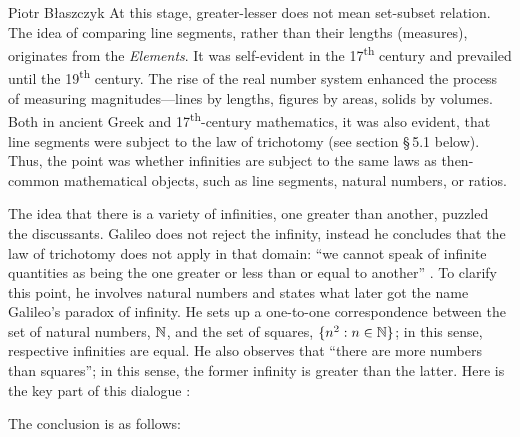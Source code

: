 \begin{artengenv}{Piotr Błaszczyk}
At this stage, greater-lesser does not mean set-subset relation. The idea of comparing line segments, rather than their lengths (measures), originates from the \textit{Elements}. It was self-evident in the 17\textsuperscript{th} century and prevailed until the 19\textsuperscript{th} century. The rise of the real number system enhanced the process of measuring 
magnitudes---lines by lengths, figures by areas, solids by volumes.  
Both in ancient Greek and 17\textsuperscript{th}-century mathematics, it was also evident,  that line segments were subject to the law of trichotomy (see section \S\,5.1 below). Thus, the point was whether infinities are subject to the same laws as then-common mathematical objects, such as line segments,  natural numbers, or ratios.

The idea that there is a variety of infinities,  one greater than another, puzzled the discussants.  Galileo  does not  reject the infinity, instead  he concludes that the law of  trichotomy does not apply in that domain:
``we cannot speak of infinite quantities as being the one greater or less than or equal to another'' \parencite[30]{ref_GG56}. 
To clarify this point, he involves natural numbers and states what later got the name Galileo's paradox of infinity.   
He sets up a one-to-one correspondence between the set of natural numbers, ${\mathbb{N}}$, and the set of squares, $\{n^2: n\in{\mathbb{N}}\}$; in this sense, respective infinities  are equal.
 He also observes that ``there are more numbers than squares''; in this sense, the former infinity is greater than the latter.  Here is the key part of this dialogue \parencite[33]{ref_GG56}:
 

The conclusion is as follows: 



\end{artengenv}
